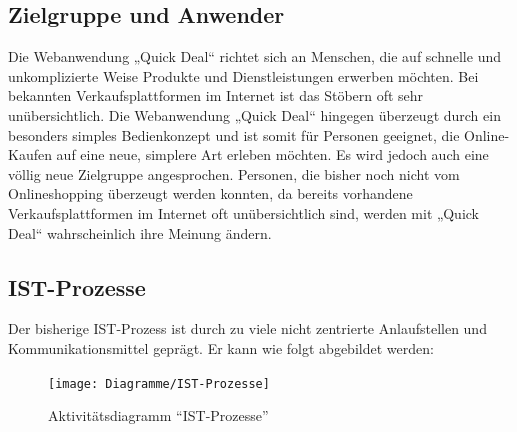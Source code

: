 \documentclass[a4paper,12pt,oneside]{scrartcl}
\begin{document}
\subsection{Zielgruppe und Anwender}
Die Webanwendung „Quick Deal“ richtet sich an Menschen, die auf schnelle und unkomplizierte Weise Produkte und Dienstleistungen erwerben möchten.
Bei bekannten Verkaufsplattformen im Internet ist das Stöbern oft sehr unübersichtlich.
Die Webanwendung „Quick Deal“ hingegen überzeugt durch ein besonders simples Bedienkonzept und ist somit für Personen geeignet, die Online-Kaufen auf eine neue, simplere Art erleben möchten.
Es wird jedoch auch eine völlig neue Zielgruppe angesprochen.
Personen, die bisher noch nicht vom Onlineshopping überzeugt werden konnten, da bereits vorhandene Verkaufsplattformen im Internet oft unübersichtlich sind, werden mit „Quick Deal“ wahrscheinlich ihre Meinung ändern.



\subsection{IST-Prozesse}
Der bisherige IST-Prozess ist durch zu viele nicht zentrierte Anlaufstellen und Kommunikationsmittel geprägt.
Er kann wie folgt abgebildet werden:

\begin{figure}[!htbp]
\centering
\noindent\texttt{[image: Diagramme/IST-Prozesse]}
\caption{Aktivitätsdiagramm "`IST-Prozesse"'}
\end{figure}
\FloatBarrier
\end{document}
